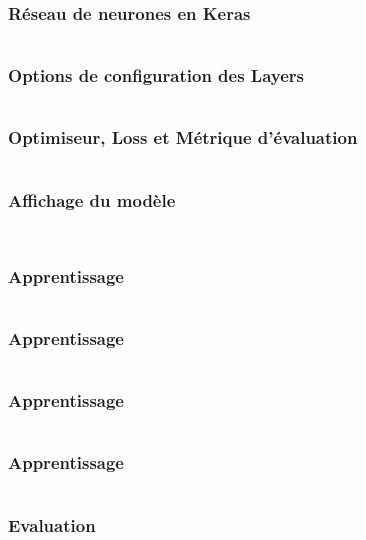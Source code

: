 \begin{frame}
  \frametitle{Réseau de neurones en Keras}
  \inputminted[linenos,fontsize=\small,bgcolor=pythonbg]{python}{code/tf-keras-mlp.py}
\end{frame}

\begin{frame}
  \frametitle{Options de configuration des Layers}
  \inputminted[linenos,fontsize=\small,bgcolor=pythonbg]{python}{code/tf-keras-configurelayer.py}
\end{frame}

\begin{frame}
  \frametitle{Optimiseur, Loss et Métrique d'évaluation}
  \inputminted[linenos,fontsize=\small,bgcolor=pythonbg]{python}{code/tf-keras-compile.py}
\end{frame}

\begin{frame}
  \frametitle{Affichage du modèle}
  \inputminted[linenos,fontsize=\small,bgcolor=pythonbg]{python}{code/tf-keras-print-model.py}
  \inputminted[linenos,fontsize=\small,bgcolor=returnbg]{python}{code/tf-keras-print-model.txt}
\end{frame}

\begin{frame}
  \frametitle{Apprentissage}
  \inputminted[linenos,fontsize=\small,bgcolor=pythonbg]{python}{code/tf-keras-learn-1.py}
\end{frame}

\begin{frame}
  \frametitle{Apprentissage}
  \inputminted[linenos,fontsize=\small,bgcolor=pythonbg]{python}{code/tf-keras-learn-2.py}
\end{frame}

\begin{frame}
  \frametitle{Apprentissage}
  \inputminted[linenos,fontsize=\small,bgcolor=pythonbg]{python}{code/tf-keras-learn-3.py}
\end{frame}

\begin{frame}
  \frametitle{Apprentissage}
  \inputminted[linenos,fontsize=\small,bgcolor=pythonbg]{python}{code/tf-keras-learn-4.py}
\end{frame}

\begin{frame}
  \frametitle{Evaluation}
  \inputminted[linenos,fontsize=\small,bgcolor=pythonbg]{python}{code/tf-keras-evaluate.py}
  \inputminted[linenos,fontsize=\small,bgcolor=returnbg]{text}{code/tf-keras-evaluate.txt}
\end{frame}

